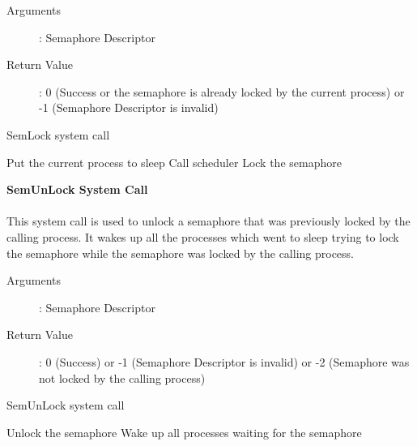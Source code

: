 \documentclass[10pt]{article}
\begin{document}
\begin{description}
\item[Arguments]: Semaphore Descriptor
\item[Return Value]: 0 (Success or the semaphore is already locked by the current process) or -1 (Semaphore Descriptor is invalid)
\end{description} 
\begin{algorithm}
\caption{SemLock system call}
\begin{algorithmic}
\ENDIF
{}
\ENDIF
{}
            \STATE Put the current process to sleep
            \STATE Call scheduler
        \ENDWHILE
    \ENDIF
\ENDIF
\STATE Lock the semaphore
\end{algorithmic}
\end{algorithm}
\vspace{3mm}
\textbf{SemUnLock System Call}
\\ \\
This system call is used to unlock a semaphore that was previously locked by the calling process. It wakes up all the processes which went to sleep trying to lock the semaphore while the semaphore was locked by the calling process. 
\begin{description}
\item[Arguments]: Semaphore Descriptor
\item[Return Value]: 0 (Success) or -1 (Semaphore Descriptor is invalid) or -2 (Semaphore was not locked by the calling process)
\end{description} 
\begin{algorithm}
\caption{SemUnLock system call}
\begin{algorithmic}
\ENDIF
{}
\ENDIF
{}
    \STATE Unlock the semaphore
    \STATE Wake up all processes waiting for the semaphore
\ELSE
\ENDIF
{}
\end{algorithmic}
\end{algorithm}
\vspace{8mm}
\end{document}
